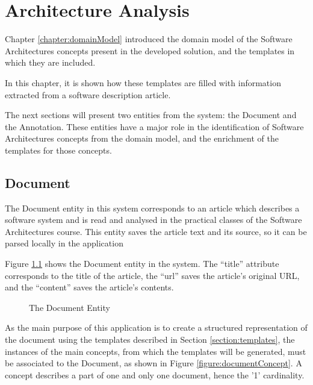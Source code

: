 
\chapter{Architecture Analysis}
\label{chapter:architecture}
Chapter \ref{chapter:domainModel} introduced the domain model of the Software Architectures concepts present in the developed solution, and the templates in which they are included.

In this chapter, it is shown how these templates are filled with information extracted from a software description article.

The next sections will present two entities from the system: the Document and the Annotation. These entities have a major role in the identification of Software Architectures concepts from the domain model, and the enrichment of the templates for those concepts. 

\section{Document}
\label{section:document}

The Document entity in this system corresponds to an article which describes a software system and is read and analysed in the practical classes of the Software Architectures course. This entity saves the article text and its source, so it can be parsed locally in the application

Figure \ref{figure:documentEntity} shows the Document entity in the system. The ``title'' attribute corresponds to the title of the article, the ``url'' saves the article's original URL, and the ``content'' saves the article's contents.

\begin{figure}[h]
\centering
\renewcommand {\umltextcolor}{black}
\renewcommand {\umlfillcolor}{none}
\renewcommand {\umldrawcolor}{black}

\caption{The Document Entity}
\label{figure:documentEntity}
\end{figure}

As the main purpose of this application is to create a structured representation of the document using the templates described in Section \ref{section:templates}, the instances of the main concepts, from which the templates will be generated, must be associated to the Document, as shown in Figure \ref{figure:documentConcept}. A concept describes a part of one and only one document, hence the '1' cardinality.  

